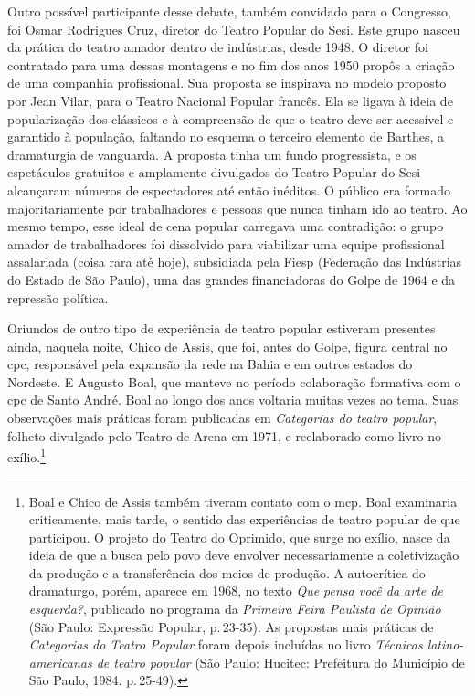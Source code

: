 Outro possível participante desse debate, também convidado para o
Congresso, foi Osmar Rodrigues Cruz, diretor do Teatro Popular do Sesi.
Este grupo nasceu da prática do teatro amador dentro de indústrias,
desde 1948. O diretor foi contratado para uma dessas montagens e no fim
dos anos 1950 propôs a criação de uma companhia profissional. Sua
proposta se inspirava no modelo proposto por Jean Vilar, para o Teatro
Nacional Popular francês. Ela se ligava à ideia de popularização dos
clássicos e à compreensão de que o teatro deve ser acessível e garantido
à população, faltando no esquema o terceiro elemento de Barthes, a
dramaturgia de vanguarda. A proposta tinha um fundo progressista, e os
espetáculos gratuitos e amplamente divulgados do Teatro Popular do Sesi
alcançaram números de espectadores até então inéditos. O público era
formado majoritariamente por trabalhadores e pessoas que nunca tinham
ido ao teatro. Ao mesmo tempo, esse ideal de cena popular carregava uma
contradição: o grupo amador de trabalhadores foi dissolvido para
viabilizar uma equipe profissional assalariada (coisa rara até hoje),
subsidiada pela Fiesp (Federação das Indústrias do Estado de São Paulo),
uma das grandes financiadoras do Golpe de 1964 e da repressão política.

Oriundos de outro tipo de experiência de teatro popular estiveram
presentes ainda, naquela noite, Chico de Assis, que foi, antes do Golpe,
figura central no {\sc cpc}, responsável pela expansão da rede na Bahia e em
outros estados do Nordeste. E Augusto Boal, que manteve no período
colaboração formativa com o {\sc cpc} de Santo André. Boal ao longo dos anos
voltaria muitas vezes ao tema. Suas observações mais práticas foram
publicadas em {\it Categorias do teatro popular}, folheto divulgado pelo
Teatro de Arena em 1971, e reelaborado como livro no exílio.\footnote{Boal
  e Chico de Assis também tiveram contato com o {\sc mcp}. Boal examinaria
  criticamente, mais tarde, o sentido das experiências de teatro popular
  de que participou. O projeto do Teatro do Oprimido, que surge no
  exílio, nasce da ideia de que a busca pelo povo deve envolver
  necessariamente a coletivização da produção e a transferência dos
  meios de produção. A autocrítica do dramaturgo, porém, aparece em
  1968, no texto {\it Que pensa você da arte de esquerda?}, publicado no
  programa da {\it Primeira Feira Paulista de Opinião} (São Paulo:
  Expressão Popular, p.\,23-35). As propostas mais práticas de
  {\it Categorias do Teatro Popular} foram depois incluídas no livro
  {\it Técnicas latino-americanas de teatro popular} (São Paulo:
  Hucitec: Prefeitura do Município de São Paulo, 1984. p.\,25-49).}

